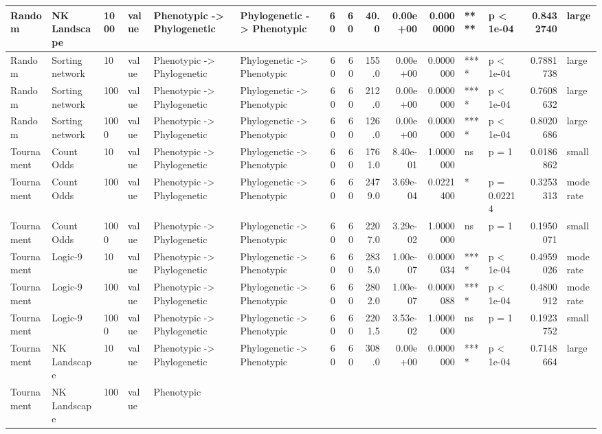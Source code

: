 \documentclass[]{book}
\begin{document}
\begin{table}
\begin{tabular}[t]{l|l|l|l|l|l|r|r|r|r|r|l|l|r|l}
\hline
Random & NK Landscape & 1000 & value & Phenotypic
    ->
Phylogenetic & Phylogenetic
    ->
Phenotypic & 60 & 60 & 40.0 & 0.00e+00 & 0.0000000 & **** & p < 1e-04 & 0.8432740 & large\\
\hline
Random & Sorting network & 10 & value & Phenotypic
    ->
Phylogenetic & Phylogenetic
    ->
Phenotypic & 60 & 60 & 155.0 & 0.00e+00 & 0.0000000 & **** & p < 1e-04 & 0.7881738 & large\\
\hline
Random & Sorting network & 100 & value & Phenotypic
    ->
Phylogenetic & Phylogenetic
    ->
Phenotypic & 60 & 60 & 212.0 & 0.00e+00 & 0.0000000 & **** & p < 1e-04 & 0.7608632 & large\\
\hline
Random & Sorting network & 1000 & value & Phenotypic
    ->
Phylogenetic & Phylogenetic
    ->
Phenotypic & 60 & 60 & 126.0 & 0.00e+00 & 0.0000000 & **** & p < 1e-04 & 0.8020686 & large\\
\hline
Tournament & Count Odds & 10 & value & Phenotypic
    ->
Phylogenetic & Phylogenetic
    ->
Phenotypic & 60 & 60 & 1761.0 & 8.40e-01 & 1.0000000 & ns & p = 1 & 0.0186862 & small\\
\hline
Tournament & Count Odds & 100 & value & Phenotypic
    ->
Phylogenetic & Phylogenetic
    ->
Phenotypic & 60 & 60 & 2479.0 & 3.69e-04 & 0.0221400 & * & p = 0.02214 & 0.3253313 & moderate\\
\hline
Tournament & Count Odds & 1000 & value & Phenotypic
    ->
Phylogenetic & Phylogenetic
    ->
Phenotypic & 60 & 60 & 2207.0 & 3.29e-02 & 1.0000000 & ns & p = 1 & 0.1950071 & small\\
\hline
Tournament & Logic-9 & 10 & value & Phenotypic
    ->
Phylogenetic & Phylogenetic
    ->
Phenotypic & 60 & 60 & 2835.0 & 1.00e-07 & 0.0000034 & **** & p < 1e-04 & 0.4959026 & moderate\\
\hline
Tournament & Logic-9 & 100 & value & Phenotypic
    ->
Phylogenetic & Phylogenetic
    ->
Phenotypic & 60 & 60 & 2802.0 & 1.00e-07 & 0.0000088 & **** & p < 1e-04 & 0.4800912 & moderate\\
\hline
Tournament & Logic-9 & 1000 & value & Phenotypic
    ->
Phylogenetic & Phylogenetic
    ->
Phenotypic & 60 & 60 & 2201.5 & 3.53e-02 & 1.0000000 & ns & p = 1 & 0.1923752 & small\\
\hline
Tournament & NK Landscape & 10 & value & Phenotypic
    ->
Phylogenetic & Phylogenetic
    ->
Phenotypic & 60 & 60 & 308.0 & 0.00e+00 & 0.0000000 & **** & p < 1e-04 & 0.7148664 & large\\
\hline
Tournament & NK Landscape & 100 & value & Phenotypic

\end{tabular}
\end{table}
\end{document}
